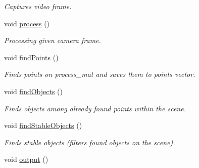 \begin{DoxyCompactItemize}
\begin{DoxyCompactList}\small\item\em \-Captures video frame. \end{DoxyCompactList}\item 
\hypertarget{classDiodeFinder_a5c5f10c380842f93a5c0c1e4e4e3afb3}{void \hyperlink{classDiodeFinder_a5c5f10c380842f93a5c0c1e4e4e3afb3}{process} ()}\label{classDiodeFinder_a5c5f10c380842f93a5c0c1e4e4e3afb3}

\begin{DoxyCompactList}\small\item\em \-Processing given camera frame. \end{DoxyCompactList}\item 
\hypertarget{classDiodeFinder_a5a3404a6c041a6d4573e9a99b4c08f50}{void \hyperlink{classDiodeFinder_a5a3404a6c041a6d4573e9a99b4c08f50}{find\-Points} ()}\label{classDiodeFinder_a5a3404a6c041a6d4573e9a99b4c08f50}

\begin{DoxyCompactList}\small\item\em \-Finds points on process\-\_\-mat and saves them to points vector. \end{DoxyCompactList}\item 
\hypertarget{classDiodeFinder_a91081fdda0f688fc07ce7cbe2adc49c3}{void \hyperlink{classDiodeFinder_a91081fdda0f688fc07ce7cbe2adc49c3}{find\-Objects} ()}\label{classDiodeFinder_a91081fdda0f688fc07ce7cbe2adc49c3}

\begin{DoxyCompactList}\small\item\em \-Finds objects among already found points within the scene. \end{DoxyCompactList}\item 
\hypertarget{classDiodeFinder_aedd9857714460c97d7c5bba73e316bb8}{void \hyperlink{classDiodeFinder_aedd9857714460c97d7c5bba73e316bb8}{find\-Stable\-Objects} ()}\label{classDiodeFinder_aedd9857714460c97d7c5bba73e316bb8}

\begin{DoxyCompactList}\small\item\em \-Finds stable objects (filters found objects on the scene). \end{DoxyCompactList}\item 
\hypertarget{classDiodeFinder_a283d788301734c1038b1c8c24f773a74}{void \hyperlink{classDiodeFinder_a283d788301734c1038b1c8c24f773a74}{output} ()}\label{classDiodeFinder_a283d788301734c1038b1c8c24f773a74}


\end{DoxyCompactItemize}
